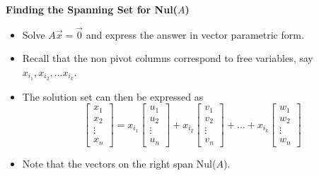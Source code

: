  \begin{frame}[fragile]

\textbf{Finding the Spanning Set for Nul($A$)}

\begin{itemize}
\item Solve $A\vec{x}=\vec{0}$ and express the answer in vector parametric form.     
\item  Recall that the non pivot columns correspond to free variables, say $x_{i_1}, x_{i_2}, \dots x_{i_k}$.  
\item The solution set can then be expressed as 
$$
 \left[ \begin{array}{rrrr} 
 x_1 \\ x_2  \\ \vdots \\ x_n
\end{array}\right]
= 
x_{i_1} 
\left[\begin{array}{rrrr}
u_1 \\ u_2 \\ \vdots \\ u_n
\end{array}\right]
+ 
x_{i_2}
\left[\begin{array}{rrrr}
v_1 \\ v_2 \\ \vdots \\ v_n
\end{array}\right]
+
\dots  +
x_{i_k}
\left[\begin{array}{rrrr}
w_1 \\ w_2  \\ \vdots \\ w_n
\end{array}\right]
$$ 

\item Note that the vectors on the right span Nul($A$).
\end{itemize}

\end{frame}






